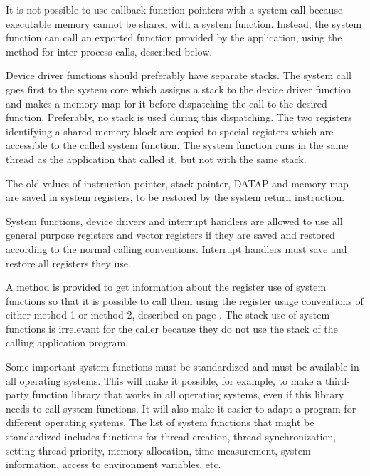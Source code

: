 \documentclass[forwardcom.tex]{subfiles}
\begin{document}
It is not possible to use callback function pointers with a system call because executable memory cannot be shared with a system function. Instead, the system function can call an exported function provided by the application, using the method for inter-process calls, described below.
\vspace{2mm}

Device driver functions should preferably have separate stacks. The system call goes first to the system core which assigns a stack to the device driver function and makes a memory map for it before dispatching the call to the desired function. Preferably, no stack is used during this dispatching. The two registers identifying a shared memory block are copied to special registers which are accessible to the called system function. The system function runs in the same thread as the application that called it, but not with the same stack. 
\vspace{2mm}

The old values of instruction pointer, stack pointer, DATAP and memory map are saved in system registers, to be restored by the system return instruction. 
\vspace{2mm}

System functions, device drivers and interrupt handlers are allowed to use all general purpose registers and vector registers if they are saved and restored according to the normal calling conventions. Interrupt handlers must save and restore all registers they use. 
\vspace{2mm}

A method is provided to get information about the register use of system functions so that it is possible to call them using the register usage conventions of either method 1 or method 2, described on page \pageref{registerUsageConvention}. The stack use of system functions is irrelevant for the caller because they do not use the stack of the calling application program. 
\vspace{2mm}

Some important system functions must be standardized and must be available in all operating systems. This will make it possible, for example, to make a third-party function library that works in all operating systems, even if this library needs to call system functions. It will also make it easier to adapt a program for different operating systems. The list of system functions that might be standardized includes functions for thread creation, thread synchronization, setting thread priority, memory allocation, time measurement, system information, access to environment variables, etc. 
\vspace{2mm}
\end{document}
